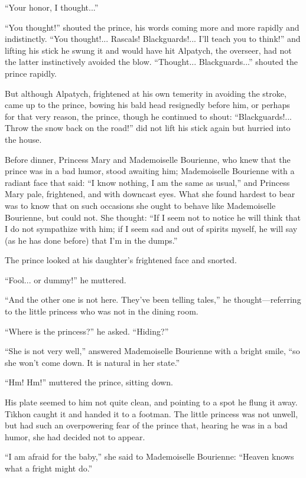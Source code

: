 ``Your honor, I thought...''

``You thought!'' shouted the prince, his words coming more and
more rapidly and indistinctly. ``You thought!... Rascals!
Blackguards!... I'll teach you to think!'' and lifting his stick
he swung it and would have hit Alpatych, the overseer, had not
the latter instinctively avoided the
blow. ``Thought... Blackguards...'' shouted the prince rapidly.

But although Alpatych, frightened at his own temerity in avoiding
the stroke, came up to the prince, bowing his bald head
resignedly before him, or perhaps for that very reason, the
prince, though he continued to shout: ``Blackguards!... Throw the
snow back on the road!'' did not lift his stick again but hurried
into the house.

Before dinner, Princess Mary and Mademoiselle Bourienne, who knew
that the prince was in a bad humor, stood awaiting him;
Mademoiselle Bourienne with a radiant face that said: ``I know
nothing, I am the same as usual,'' and Princess Mary pale,
frightened, and with downcast eyes.  What she found hardest to
bear was to know that on such occasions she ought to behave like
Mademoiselle Bourienne, but could not. She thought: ``If I seem
not to notice he will think that I do not sympathize with him; if
I seem sad and out of spirits myself, he will say (as he has done
before) that I'm in the dumps.''

The prince looked at his daughter's frightened face and snorted.

``Fool... or dummy!'' he muttered.

``And the other one is not here. They've been telling tales,'' he
thought---referring to the little princess who was not in the
dining room.

``Where is the princess?'' he asked. ``Hiding?''

``She is not very well,'' answered Mademoiselle Bourienne with a
bright smile, ``so she won't come down. It is natural in her
state.''

``Hm! Hm!'' muttered the prince, sitting down.

His plate seemed to him not quite clean, and pointing to a spot
he flung it away. Tikhon caught it and handed it to a
footman. The little princess was not unwell, but had such an
overpowering fear of the prince that, hearing he was in a bad
humor, she had decided not to appear.

``I am afraid for the baby,'' she said to Mademoiselle Bourienne:
``Heaven knows what a fright might do.''

